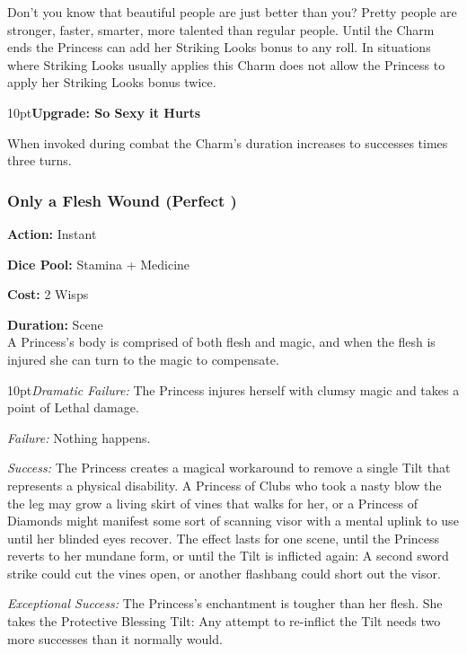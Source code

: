 \noindent Don't you know that beautiful people are just better than you? Pretty people are stronger, faster, smarter, more talented than regular people. Until the Charm ends the Princess can add her Striking Looks bonus to any roll. In situations where Striking Looks usually applies this Charm does not allow the Princess to apply her Striking Looks bonus twice.

\begin{myindentpar}{10pt}\textbf{Upgrade: So Sexy it Hurts}

When invoked during combat the Charm's duration increases to successes times three turns.\end{myindentpar}

\subsubsection*{Only a Flesh Wound (Perfect \textbullet\textbullet)}

\noindent \textbf{Action:} Instant

\noindent \textbf{Dice Pool:} Stamina + Medicine

\noindent \textbf{Cost:} 2 Wisps 

\noindent \textbf{Duration:} Scene \\

\noindent A Princess's body is comprised of both flesh and magic, and when the flesh is injured she can turn to the magic to compensate. 

\begin{myindentpar}{10pt}\emph{Dramatic Failure:} The Princess injures herself with clumsy magic and takes a point of Lethal damage. 
 
\emph{Failure:} Nothing happens. 

\emph{Success:} The Princess creates a magical workaround to remove a single Tilt that represents a physical disability. A Princess of Clubs who took a nasty blow the the leg may grow a living skirt of vines that walks for her, or a Princess of Diamonds might manifest some sort of scanning visor with a mental uplink to use until her blinded eyes recover. The effect lasts for one scene, until the Princess reverts to her mundane form, or until the Tilt is inflicted again: A second sword strike could cut the vines open, or another flashbang could short out the visor. 

\emph{Exceptional Success:} The Princess's enchantment is tougher than her flesh. She takes the Protective Blessing Tilt: Any attempt to re-inflict the Tilt needs two more successes than it normally would.\end{myindentpar}


